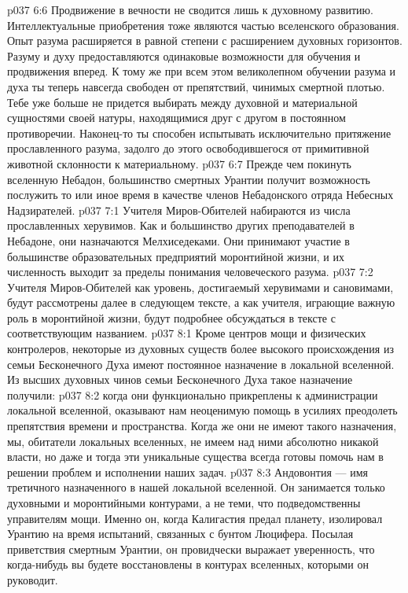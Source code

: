 \vs p037 6:6 Продвижение в вечности не сводится лишь к духовному развитию. Интеллектуальные приобретения тоже являются частью вселенского образования. Опыт разума расширяется в равной степени с расширением духовных горизонтов. Разуму и духу предоставляются одинаковые возможности для обучения и продвижения вперед. К тому же при всем этом великолепном обучении разума и духа ты теперь навсегда свободен от препятствий, чинимых смертной плотью. Тебе уже больше не придется выбирать между духовной и материальной сущностями своей натуры, находящимися друг с другом в постоянном противоречии. Наконец\hyp{}то ты способен испытывать исключительно притяжение прославленного разума, задолго до этого освободившегося от примитивной животной склонности к материальному.
\vs p037 6:7 \pc Прежде чем покинуть вселенную Небадон, большинство смертных Урантии получит возможность послужить то или иное время в качестве членов Небадонского отряда Небесных Надзирателей.
\vs p037 7:1 Учителя Миров\hyp{}Обителей набираются из числа прославленных херувимов. Как и большинство других преподавателей в Небадоне, они назначаются Мелхиседеками. Они принимают участие в большинстве образовательных предприятий моронтийной жизни, и их численность выходит за пределы понимания человеческого разума.
\vs p037 7:2 Учителя Миров\hyp{}Обителей как уровень, достигаемый херувимами и сановимами, будут рассмотрены далее в следующем тексте, а как учителя, играющие важную роль в моронтийной жизни, будут подробнее обсуждаться в тексте с соответствующим названием.
\vs p037 8:1 Кроме центров мощи и физических контролеров, некоторые из духовных существ более высокого происхождения из семьи Бесконечного Духа имеют постоянное назначение в локальной вселенной. Из высших духовных чинов семьи Бесконечного Духа такое назначение получили:
\vs p037 8:2 \pc {} когда они функционально прикреплены к администрации локальной вселенной, оказывают нам неоценимую помощь в усилиях преодолеть препятствия времени и пространства. Когда же они не имеют такого назначения, мы, обитатели локальных вселенных, не имеем над ними абсолютно никакой власти, но даже и тогда эти уникальные существа всегда готовы помочь нам в решении проблем и исполнении наших задач.
\vs p037 8:3 Андовонтия --- имя третичного  назначенного в нашей локальной вселенной. Он занимается только духовными и моронтийными контурами, а не теми, что подведомственны управителям мощи. Именно он, когда Калигастия предал планету, изолировал Урантию на время испытаний, связанных с бунтом Люцифера. Посылая приветствия смертным Урантии, он провидчески выражает уверенность, что когда\hyp{}нибудь вы будете восстановлены в контурах вселенных, которыми он руководит.
